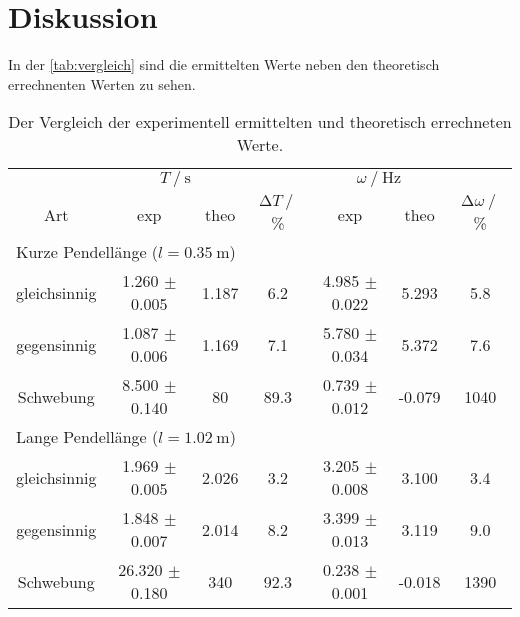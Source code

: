 \section{Diskussion}
\label{sec:Diskussion}

In der \autoref{tab:vergleich} sind die ermittelten Werte neben den theoretisch errechnenten Werten zu sehen. 

\begin{table}
    \centering
    \caption{Der Vergleich der experimentell ermittelten und theoretisch errechneten Werte.}
    \label{tab:vergleich}
    \begin{tabular}{c c c c c c c}
        \toprule
        &\multicolumn{2}{c}{$T \mathbin{/} \si{\s}$} & & \multicolumn{2}{c}{$ \omega \mathbin{/} \si{\hertz}$}\\
        \cmidrule(lr){2-3} \cmidrule(lr){5-6}
        Art & exp & theo & $\increment T \mathbin{/}$ \% & exp & theo & $\increment \omega \mathbin{/}$ \% \\
        \midrule
        \multicolumn{7}{l}{Kurze Pendellänge ($l = \SI{0.35}{\metre}$)}\\
        \midrule
        gleichsinnig &  1.260 $\pm$ 0.005 &     1.187 &     6.2     &   4.985 $\pm$ 0.022 &    5.293 &      5.8 \\
        gegensinnig  &  1.087 $\pm$ 0.006 &     1.169 &     7.1     &   5.780 $\pm$ 0.034 &    5.372 &      7.6 \\
        Schwebung    &  8.500 $\pm$ 0.140 &    80     &    89.3     &   0.739 $\pm$ 0.012 &   -0.079 &      1040 \\
        \midrule
        \multicolumn{7}{l}{Lange Pendellänge ($l = \SI{1.02}{\metre}$)}\\
        \midrule
        gleichsinnig &  1.969 $\pm$ 0.005 &     2.026 &     3.2     &   3.205 $\pm$ 0.008 &    3.100 &      3.4 \\
        gegensinnig  &  1.848 $\pm$ 0.007 &     2.014 &     8.2     &   3.399 $\pm$ 0.013 &    3.119 &      9.0 \\
        Schwebung    & 26.320 $\pm$ 0.180 &   340     &    92.3     &   0.238 $\pm$ 0.001 &   -0.018 &      1390\\
        \bottomrule
    \end{tabular}
\end{table}

